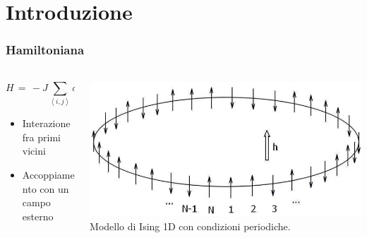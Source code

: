 \section{Introduzione}

\begin{frame}
    \frametitle{Hamiltoniana}
    \framesubtitle{}

    \begin{columns}
        \begin{column}{0.5\textwidth}
			
			\vspace{12pt}

			\begin{equation*}
				H\,=\,-J\sum_{\left<i,j\right>}\sigma_i\sigma_j\,-\,h\sum_{i} \sigma_i
				\label{eq: Ham_Ising}
			\end{equation*}

			\vspace{12pt}

            \begin{itemize}[itemsep=0.5em, label=$\diamond$]
                \item Interazione fra primi vicini
                \item Accoppiamento con un campo esterno
            \end{itemize}

        \end{column}

        
        \begin{column}{0.5\textwidth}
				\centering
				\includegraphics[width=\textwidth]{Immagini/Introduzione/modelloIsing1D_pbc.png}
				{\scriptsize Modello di Ising 1D con condizioni periodiche.}
		
		\end{column}
      \end{columns}
  
\end{frame}



